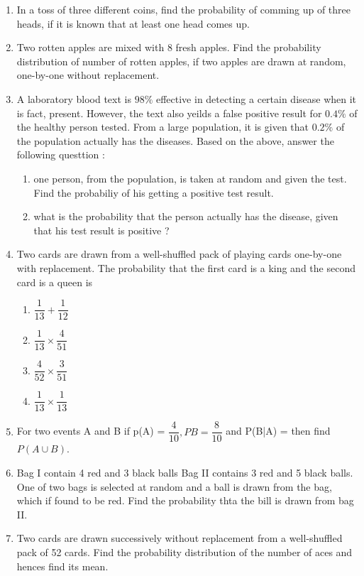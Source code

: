 \begin{enumerate}
\item In a toss of three different coins, find the probability of comming up of three heads, if it is known that at least one head comes up.
\item Two rotten apples are mixed with 8 fresh apples. Find the probability distribution of number of rotten apples, if two apples are drawn at  random, one-by-one without replacement.
\item A laboratory blood text is $98\%$ effective  in detecting a certain disease when it is fact, present. However, the text also yeilds a false positive result for $0.4\%$ of the healthy person tested. From a large population, it is given that $0.2\%$ of the population actually has the diseases.
Based on the above, answer the following questtion : \\
\begin{enumerate}
\item one person, from the population, is taken at random and given the test. Find the probabiliy of his getting a positive test result.
\item what is the probability that the person actually has the disease, given that his test result is positive ?
\end{enumerate}
\item Two cards are drawn from a well-shuffled pack of playing cards one-by-one with replacement. The probability that the first card is a king and the second card is a queen is 
\begin{enumerate}
\item $\dfrac{1}{13} + \dfrac{1}{12}$
\item $ \dfrac{1}{13} \times \dfrac{4}{51}$
\item $\dfrac{4}{52} \times \dfrac{3}{51}$
\item $\dfrac{1}{13} \times \dfrac{1}{13}$
\end{enumerate}
\item For two events A and B if p(A) = $\dfrac{4}{10}, P{B} = \dfrac{8}{10}$ and P(B|A) = then find $P( A \cup B).$
\item Bag I contain 4 red and 3 black balls Bag II contains 3 red and 5 black balls. One of two bags is selected at random and a ball is drawn from the bag, which if found to be red. Find the probability thta the bill is drawn from bag II.
\item Two cards are drawn successively without replacement from a well-shuffled pack of 52 cards. Find the probability distribution of the number of aces and hences find its mean.

\end{enumerate}
